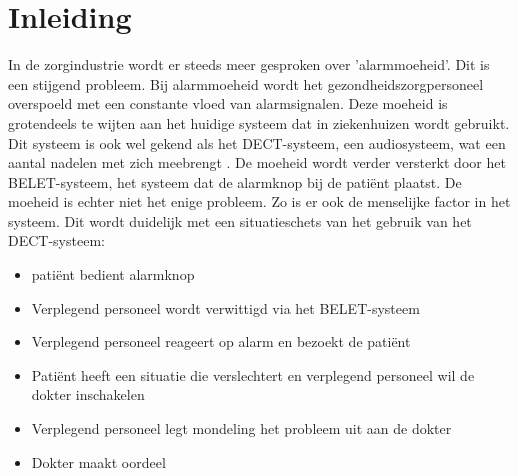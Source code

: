 


% 

\section{Inleiding}%
\label{sec:inleiding}

In de zorgindustrie wordt er steeds meer gesproken over 'alarmmoeheid'. Dit is een stijgend probleem. Bij alarmmoeheid wordt het gezondheidszorgpersoneel overspoeld met een constante vloed van alarmsignalen. Deze moeheid is grotendeels te wijten aan het huidige systeem dat in ziekenhuizen wordt gebruikt. Dit systeem is ook wel gekend als het DECT-systeem, een audiosysteem, wat een aantal nadelen met zich meebrengt . De moeheid wordt verder versterkt door het BELET-systeem, het systeem dat de alarmknop bij de patiënt plaatst. De moeheid is echter niet het enige probleem. Zo is er ook de menselijke factor in het systeem. Dit wordt duidelijk met een situatieschets van het gebruik van het DECT-systeem:

\begin{itemize}
  \item patiënt bedient alarmknop
  \item Verplegend personeel wordt verwittigd via het BELET-systeem
  \item Verplegend personeel reageert op alarm en bezoekt de patiënt
  \item Patiënt heeft een situatie die verslechtert en verplegend personeel wil de dokter inschakelen
  \item Verplegend personeel legt mondeling het probleem uit aan de dokter
  \item Dokter maakt oordeel
\end{itemize}

